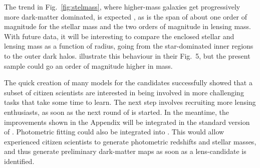 The trend in Fig.~\ref{fig:stelmass}, where higher-mass galaxies get
progressively more dark-matter dominated, is expected
\citep[see, e.g.][]{2005ApJ...623L...5F}, as is the span of about one
order of magnitude for the stellar mass and the two orders of
magnitude in lensing mass. With future data, it will be interesting to
compare the enclosed stellar and lensing mass as a function of radius,
going from the star-dominated inner regions to the outer dark
halos. \citet{2011ApJ...740...97L} illustrate this behaviour in their
Fig.~5, but the present sample could go an order of magnitude higher
in mass.

The quick creation of many models for the {\SW} candidates
successfully showed that a subset of citizen scientists are interested
in being involved in more challenging tasks that take some time to
learn. The next step involves recruiting more lensing enthusiasts, as
soon as the next round of {\SW} is started. In the meantime, the
improvements shown in the Appendix will be integrated in the standard
version of {\SpL}. Photometric fitting could also be
integrated into {\SpL}. This would allow experienced citizen
scientists to generate photometric redshifts and stellar masses, and
thus generate preliminary dark-matter maps as soon as a lens-candidate
is identified.

